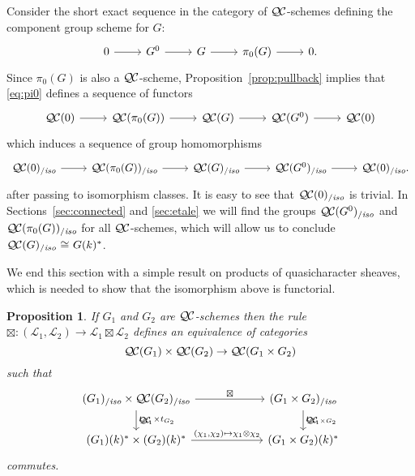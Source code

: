 \documentclass[11pt]{amsart}
\theoremstyle{plain}
\newtheorem{proposition}[theorem]{Proposition}
\theoremstyle{definition}
\theoremstyle{remark}
\newcommand{\Fq}{k}
\newcommand{\iso}{{\ \cong\ }}
\newcommand{\qcs}[1]{{\mathcal{#1}}}
\newcommand{\QC}{{\mathcal{Q\hskip-0.8pt C}}}
\newcommand{\QCiso}[1]{\QC(#1)_{/\textit{iso}}}
\newcommand{\trFrob}[1]{t_{#1}}
\begin{document}
Consider the short exact sequence in the category of $\QC$-schemes
defining the component group scheme for $G$:
\begin{equation}\label{eq:pi0}
\begin{tikzcd}
0 \rar & G^0 \rar & G \rar & \pi_0(G) \rar & 0.
\end{tikzcd}
\end{equation}
Since $\pi_0(G)$ is also a $\QC$-scheme, 
Proposition~\ref{prop:pullback} implies that \eqref{eq:pi0} defines a sequence of functors
\[
\begin{tikzcd}
\QC(0) \rar & \QC(\pi_0(G)) \rar & \QC(G) \rar & \QC(G^0) \rar & \QC(0)
\end{tikzcd}
\]
which induces a sequence of group homomorphisms 
\[
\begin{tikzcd}
\QCiso{0} \rar & \QCiso{\pi_0(G)} \rar & \QCiso{G} \rar & \QCiso{G^0} \rar & \QCiso{0}.
\end{tikzcd}
\]
after passing to isomorphism classes.  It is easy to see that $\QCiso{0}$ is trivial. In Sections~\ref{sec:connected} and \ref{sec:etale} we will find the groups $\QCiso{G^0}$
and $\QCiso{\pi_0(G)}$ for all $\QC$-schemes, 
which will allow us to conclude $\QCiso{G} \iso G(\Fq)^*$.


We end this section with a simple result on products of quasicharacter sheaves,
which is needed to show that the isomorphism above is functorial.

\begin{proposition}\label{prop:product}
If $G_1$ and $G_2$ are $\QC$-schemes then the rule $\boxtimes : (\qcs{L}_1,\qcs{L}_2)\to \qcs{L}_1\boxtimes\qcs{L}_2$ defines an equivalence of categories 
\[
\QC(G_1)\times \QC(G_2) \to \QC(G_1\times G_2)
\]
such that 
\[
\begin{tikzcd}[column sep=60]
\arrow{d}{\trFrob{G_1} \times \trFrob{G_2}} \QCiso{G_1}\times \QCiso{G_2} \arrow{r}{\boxtimes}
& \arrow{d}{\trFrob{G_1\times G_2}} \QCiso{G_1\times G_2}\\
(G_1)(\Fq)^*\times (G_2)(\Fq)^* \arrow{r}{(\chi_1,\chi_2)\mapsto \chi_1\otimes \chi_2}  & (G_1\times G_2)(\Fq)^*
\end{tikzcd}
\]
commutes.
\end{proposition}
\end{document}
